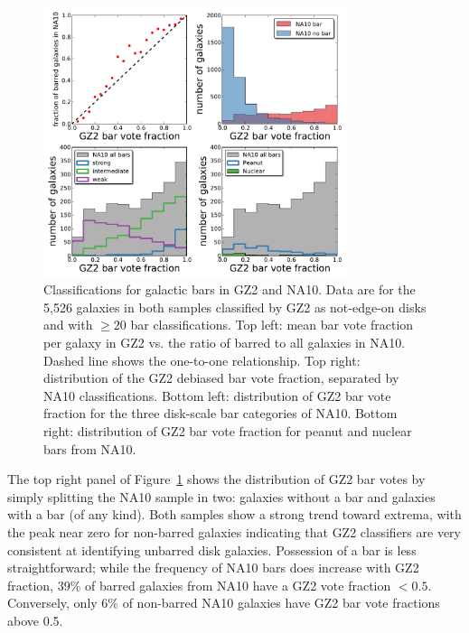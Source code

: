 \documentclass[useAMS,usenatbib]{mn2e}
\begin{document}
\begin{figure}
\includegraphics[angle=0,width=3.5in]{figures/na_bars.pdf}
\caption{Classifications for galactic bars in GZ2 and NA10. Data are for the 5,526 galaxies in both samples classified by GZ2 as not-edge-on disks and with $\geq20$ bar classifications. Top left: mean bar vote fraction per galaxy in GZ2 vs. the ratio of barred to all galaxies in NA10. Dashed line shows the one-to-one relationship. Top right: distribution of the GZ2 debiased bar vote fraction, separated by NA10 classifications. Bottom left: distribution of GZ2 bar vote fraction for the three disk-scale bar categories of NA10. Bottom right: distribution of GZ2 bar vote fraction for peanut and nuclear bars from NA10. 
\label{fig-na_bars}}
\end{figure}

The top right panel of Figure~\ref{fig-na_bars} shows the distribution of GZ2 bar votes by simply splitting the NA10 sample in two: galaxies without a bar and galaxies with a bar (of any kind). Both samples show a strong trend toward extrema, with the peak near zero for non-barred galaxies indicating that GZ2 classifiers are very consistent at identifying unbarred disk galaxies. Possession of a bar is less straightforward; while the frequency of NA10 bars does increase with GZ2 fraction, 39\% of barred galaxies from NA10 have a GZ2 vote fraction $<0.5$. Conversely, only 6\% of non-barred NA10 galaxies have GZ2 bar vote fractions above 0.5. 

\end{document}
